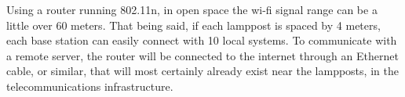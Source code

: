 Using a router running 802.11n, in open space the wi-fi signal range can be a little over 60 meters. \cite{wi_fi_802_11n} That being said, if each lamppost is spaced by 4 meters, each base station can easily connect with 10 local systems. To communicate with a remote server, the router will be connected to the internet through an Ethernet cable, or similar, that will most certainly already exist near the lampposts, in the telecommunications infrastructure.

